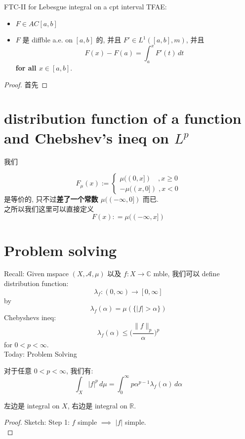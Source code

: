\documentclass[lang=cn,11pt]{elegantbook}
\begin{document}
\begin{theorem}{FTC-II for Lebesgue integral on a cpt interval}
TFAE:
\begin{itemize}
    \item $F\in AC[a,b]$
    \item $F$ 是 diffble a.e. on $[a,b]$ 的, 并且 $F'\in L^1([a,b],m)$, 并且 \[F(x) - F(a) = \int_a^x F'(t)\, dt\]\textbf{for all $x\in [a,b]$}.
\end{itemize}
\end{theorem}
\begin{proof}
    首先
\end{proof}


\chapter{distribution function of a function and Chebshev's ineq on $L^p$}
我们

$$
F_\mu(x ) := \begin{cases}
    \mu((0,x]) \quad  , x \geq 0 \\
     -\mu((x,0]) \; , x < 0
\end{cases}
$$
是等价的, 只不过\textbf{差了一个常数 $\mu((-\infty,0])$} 而已. \\
之所以我们这里可以直接定义 \[F(x) : = \mu((-\infty,x])\]




\chapter{Problem solving}
Recall: Given mspace $(X,\mathcal{A},\mu)$ 以及 $f:X \to \mathbb{C}$ mble, 我们可以 define distribution function: \[
\lambda_f : (0,\infty) \to [0,\infty]
\]
by \[
\lambda_f (\alpha) = \mu(\{\mathbb{}|f| > \alpha \} )
\]
Chebyshevs ineq: \[
\lambda_f(\alpha) \leq  \bigg(\frac{\| f\|_p}{\alpha} \bigg)^p
\]for $0< p < \infty$.\\
Today: Problem Solving



\begin{proposition}
    对于任意 $0< p < \infty$, 我们有: \[
    \int_X |f|^p \, d\mu = \int_0^\infty p \alpha^{p-1} \lambda_f (\alpha ) \, d\alpha
    \]
\end{proposition}
左边是 integral on $X$, 右边是 integral on $\mathbb{R}$.

\begin{proof}
    Sketch: 
    Step 1: $f$ simple $\implies$ $|f|$ simple.\\
    
\end{proof}
\end{document}
